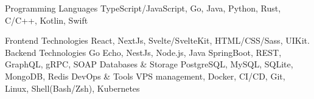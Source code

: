 

\begin{cvskills}

  \cvskill
    {Programming Languages} %
    {TypeScript/JavaScript, Go, Java, Python, Rust, C/C++, Kotlin, Swift} %

  \cvskill
    {Frontend Technologies} %
    {React, NextJs, Svelte/SvelteKit, HTML/CSS/Sass, UIKit.} %
  \cvskill
    {Backend Technologies} %
    {Go Echo, NestJs, Node.js, Java SpringBoot, REST, GraphQL, gRPC, SOAP} %
  \cvskill
    {Databases \& Storage} %
    {PostgreSQL, MySQL, SQLite, MongoDB, Redis} %
  \cvskill
    {DevOps \& Tools} %
    {VPS management, Docker, CI/CD, Git, Linux, Shell(Bash/Zsh), Kubernetes} %

\end{cvskills}
